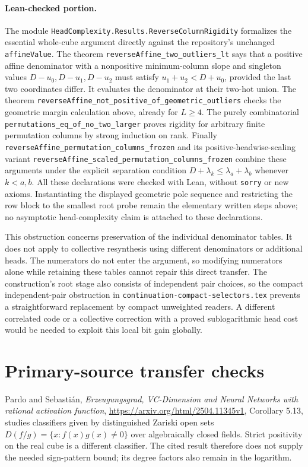 \documentclass[11pt]{article}
\begin{document}
\paragraph{Lean-checked portion.}
The module \texttt{HeadComplexity.Results.ReverseColumnRigidity}
formalizes the essential whole-cube argument directly against the
repository's unchanged \texttt{affineValue}. The theorem
\texttt{reverseAffine\_two\_outliers\_lt} says that a positive affine
denominator with a nonpositive minimum-column slope and singleton
values $D-u_0,D-u_1,D-u_2$ must satisfy
$u_1+u_2<D+u_0$, provided the last two coordinates differ. It evaluates
the denominator at their two-hot union. The theorem
\texttt{reverseAffine\_not\_positive\_of\_geometric\_outliers}
checks the geometric margin calculation above, already for $L\geq4$.
The purely combinatorial
\texttt{permutations\_eq\_of\_no\_two\_larger} proves rigidity for
arbitrary finite permutation columns by strong induction on rank.
Finally \texttt{reverseAffine\_permutation\_columns\_frozen} and
its positive-headwise-scaling variant
\texttt{reverseAffine\_scaled\_permutation\_columns\_frozen}
combine these arguments under the explicit separation condition
$D+\lambda_k\leq\lambda_a+\lambda_b$ whenever $k<a,b$.
All these declarations were checked with Lean, without \texttt{sorry}
or new axioms. Instantiating the displayed geometric pole sequence
and restricting the row block to the smallest root probe remain
the elementary written steps above; no asymptotic head-complexity
claim is attached to these declarations.

This obstruction concerns preservation of the individual denominator
tables. It does not apply to collective resynthesis using different
denominators or additional heads. The numerators do not enter the
argument, so modifying numerators alone while retaining these tables
cannot repair this direct transfer. The construction's root stage
also consists of independent pair choices, so the compact
independent-pair obstruction in
\texttt{continuation-compact-selectors.tex} prevents a straightforward
replacement by compact unweighted readers. A different correlated
code or a collective correction with a proved sublogarithmic head
cost would be needed to exploit this local bit gain globally.

\section{Primary-source transfer checks}

Pardo and Sebasti\'an, \emph{Erzeugungsgrad, VC-Dimension and Neural
Networks with rational activation function},
\url{https://arxiv.org/html/2504.11345v1}, Corollary 5.13, studies
classifiers given by distinguished Zariski open sets
$D(f/g)=\{x:f(x)g(x)\ne0\}$ over algebraically closed fields.
Strict positivity on the real cube is a different classifier.
The cited result therefore does not supply the needed sign-pattern
bound; its degree factors also remain in the logarithm.
\end{document}
